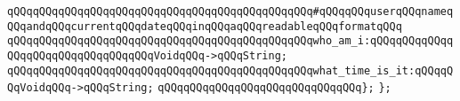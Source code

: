 \verb|qQQqqQQqqQQqqQQqqQQqqQQqqQQqqQQqqQQqqQQqqQQqqQQq#qQQqqQQquserqQQqnameqQQqandqQQqcurrentqQQqdateqQQqinqQQqaqQQqreadableqQQqformatqQQq|\newline
\verb|qQQqqQQqqQQqqQQqqQQqqQQqqQQqqQQqqQQqqQQqqQQqqQQqwho_am_i:qQQqqQQqqQQqqQQqqQQqqQQqqQQqqQQqqQQqVoidqQQq->qQQqString;|\newline
\verb|qQQqqQQqqQQqqQQqqQQqqQQqqQQqqQQqqQQqqQQqqQQqqQQqwhat_time_is_it:qQQqqQQqVoidqQQq->qQQqString;|\newline
\verb|qQQqqQQqqQQqqQQqqQQqqQQqqQQqqQQq};|\newline
\newline
\verb|};|\newline
\newline
\newline
\newline
\newline
\newline
\newline
\newline
\newline
\newline
\newline
\newline
\newline
\newline

